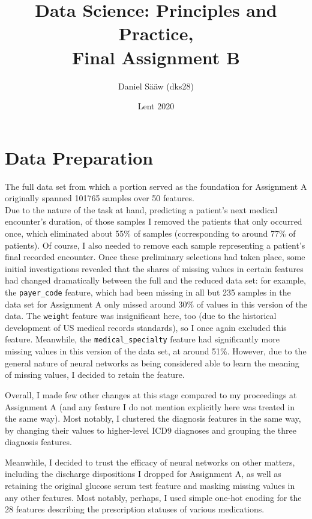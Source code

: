 \documentclass[10pt, twoside, a4paper]{article}
\author{Daniel Sääw (dks28)}
\title{Data Science: Principles and Practice,\\ Final Assignment B}
\date{Lent 2020}
\begin{document}
	\let\originalnewpage\newpage
	\let\newpage\relax
	\maketitle
	\let\newpage\originalnewpage

	\section{Data Preparation}

	The full data set from which a portion served as the foundation for Assignment A originally
	spanned 101765 samples over 50 features. \\
	Due to the nature of the task at hand, predicting a patient's next medical encounter's 
	duration, of those samples I removed the patients that only occurred once, which 
	eliminated about 55\% of samples (corresponding to around 77\% of patients). 
	Of course, I also needed to remove each sample representing a patient's final recorded 
	encounter. Once these preliminary selections had taken place, some initial investigations 
	revealed that the shares of missing values in certain features had changed dramatically 
	between the full and the reduced data set: for example, the \texttt{payer\_code} feature, 
	which had been missing in all but 235 samples in the data set for Assignment A only missed
	around 30\% of values in this version of the data. The \texttt{weight} feature was 
	insignificant here, too (due to the historical development of US medical records 
	standards), so I once again excluded this feature. Meanwhile, the \texttt{medical\_specialty} 
	feature had significantly more 
	missing values in this version of the data set, at around 51\%. However, due to the general
	nature of neural networks as being considered able to learn the meaning of missing values,
	I decided to retain the feature.
	
	Overall, I made few other changes at this stage compared to my proceedings at Assignment A
	(and any feature I do not mention explicitly here was treated in the same way).
	Most notably, I clustered the diagnosis features in the same way, by changing their values
	to higher-level ICD9 diagnoses and grouping the three diagnosis features. 

	Meanwhile, I decided to trust the efficacy of neural networks on other matters, including 
	the discharge dispositions I dropped for Assignment A, as well as retaining the original 
	glucose serum test feature and masking missing values in any other features. Most notably, 
	perhaps, I used simple one-hot enoding for the 28 features describing the prescription 
	statuses of various medications.
\end{document}
